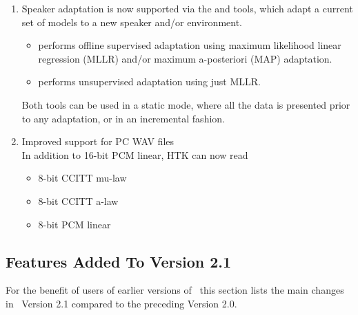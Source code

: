 \begin{enumerate}

\item Speaker adaptation is now supported via the  and 
 tools, which adapt a current set of models to a new speaker and/or
environment.
\begin{itemize}

\item {} performs offline supervised adaptation using maximum 
likelihood linear regression (MLLR) and/or maximum a-posteriori (MAP) adaptation.

\item {} performs unsupervised adaptation using just MLLR.

\end{itemize}

Both tools can be used in a static mode, where all the
data is presented prior to any adaptation, or in an incremental fashion.

\item Improved support for PC WAV files\\
In addition to 16-bit PCM linear, HTK can now read  
\begin{itemize}

\item 8-bit CCITT mu-law

\item 8-bit CCITT a-law

\item 8-bit PCM linear

\end{itemize}

\end{enumerate}

\subsection{Features Added To Version 2.1}{}

For the benefit of users of earlier versions of \HTK\, this 
 section lists the main changes 
in \HTK\ Version 2.1 compared to the preceding Version 2.0.

